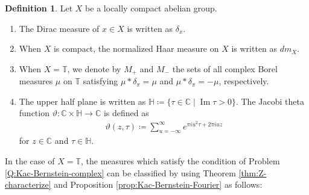 \documentclass[12pt]{article}
\theoremstyle{definition}
\newtheorem{definition}[theorem]{Definition}
\theoremstyle{remark}
\numberwithin{equation}{section}
\numberwithin{figure}{section}
\numberwithin{table}{section}
\DeclareMathOperator{\im}{Im}
\begin{document}
\begin{definition}

Let $ X $ be a locally compact abelian group.

\begin{enumerate}
\item

The Dirac measure of $ x \in X $ is written as $ \delta_x $.

\item

When $ X $ is compact, the normalized Haar measure on $ X $ is written as $ dm_X $.

\item 

When $ X = \mathbb{ T } $, we denote by $ M_+ $ and $ M_- $ the sets of all complex Borel measures $ \mu $ on $ \mathbb{T} $ satisfying $ \mu * \delta_\pi = \mu $ and $ \mu * \delta_\pi = - \mu $, respectively.

\item

The upper half plane is written as $ \mathbb{ H } \coloneqq \{ \tau \in \mathbb{ C } \mid \im \tau > 0 \} $.
The Jacobi theta function $ \vartheta \colon \mathbb{ C } \times \mathbb{ H } \to \mathbb{ C } $ is defined as
\begin{align}
    \vartheta ( z , \tau ) \coloneqq \sum_{ u = - \infty }^{ \infty } e^{ \pi i u^2 \tau + 2 \pi i u z }
\end{align}
for $ z \in \mathbb{ C } $ and $ \tau \in \mathbb{ H } $.

\end{enumerate}
    
\end{definition}

In the case of $ X = \mathbb{ T } $, the measures which satisfy the condition of Problem \ref{Q:Kac-Bernstein-complex} can be classified by using Theorem \ref{thm:Z-characterize} and Proposition \ref{prop:Kac-Bernstein-Fourier} as follows:
\end{document}
